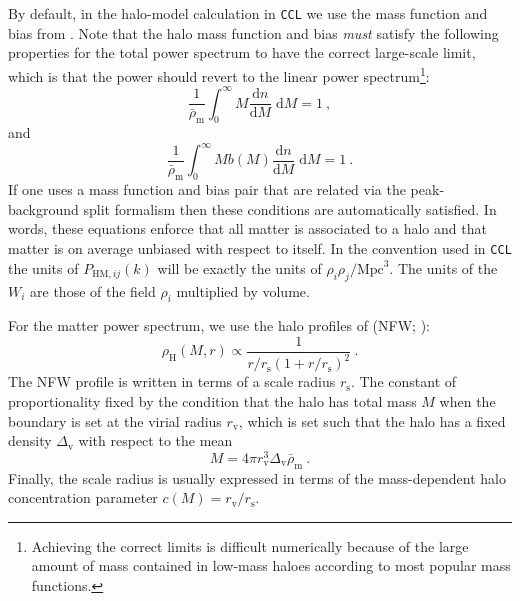 \documentclass[\docopts]{\docclass}
\newcommand{\ccl}{{\tt CCL}\xspace}
\begin{document}
By default, in the halo-model calculation in \ccl we use the mass function and bias from \cite{Sheth1999}. Note that the halo mass function and bias \emph{must} satisfy the following properties for the total power spectrum to have the correct large-scale limit, which is that the power should revert to the linear power spectrum\footnote{Achieving the correct limits is difficult numerically because of the large amount of mass contained in low-mass haloes according to most popular mass functions.}:
\begin{equation}
\frac{1}{\bar\rho_\mathrm{m}}\int_0^\infty M\frac{\mathrm{d}n}{\mathrm{d}M}\;\mathrm{d}M=1\ ,
\label{eq:mf_normalisation}
\end{equation}
and
\begin{equation}
\frac{1}{\bar\rho_\mathrm{m}}\int_0^\infty Mb(M)\frac{\mathrm{d}n}{\mathrm{d}M}\;\mathrm{d}M=1\ .
\label{eq:bias_normalisation}
\end{equation}
If one uses a mass function and bias pair that are related via the peak-background split formalism \citep{Mo1996,Sheth2001} then these conditions are automatically satisfied. In words, these equations enforce that all matter is associated to a halo and that matter is on average unbiased with respect to itself. In the convention used in \ccl the units of $P_{\mathrm{HM},ij}(k)$ will be exactly the units of $\rho_i\rho_j / \mathrm{Mpc}^3$. The units of the $W_i$ are those of the field $\rho_i$ multiplied by volume. 

For the matter power spectrum, we use the halo profiles of \citeauthor*{Navarro1997} (NFW; \citeyear{Navarro1997}):
\begin{equation}
\rho_\mathrm{H}(M,r)\propto\frac{1}{r/r_\mathrm{s}(1+r/r_\mathrm{s})^2}\ .
\label{eq:NFW_profile}
\end{equation}
The NFW profile is written in terms of a scale radius $r_\mathrm{s}$. The constant of proportionality fixed by the condition that the halo has total mass $M$ when the boundary is set at the virial radius $r_\mathrm{v}$, which is set such that the halo has a fixed density $\Delta_\mathrm{v}$  with respect to the mean
\begin{equation}
M=4\pi r_\mathrm{v}^3\Delta_\mathrm{v}\bar\rho_\mathrm{m}\ .
\label{eq:virial_radius}
\end{equation}
Finally, the scale radius is usually expressed in terms of the mass-dependent halo concentration parameter $c(M)=r_\mathrm{v}/r_\mathrm{s}$.
\end{document}
